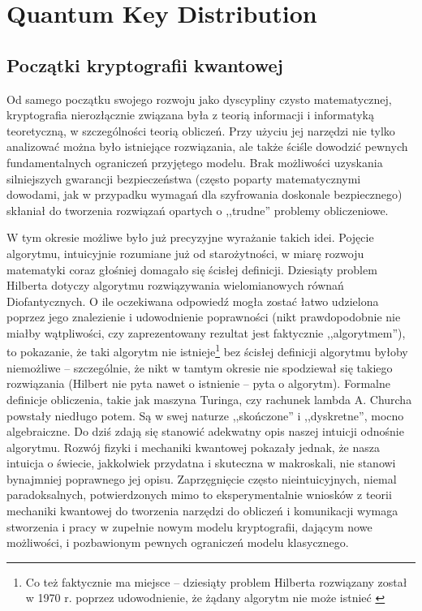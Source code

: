 \documentclass[10pt]{article}
\begin{document}

\section{Quantum Key Distribution}

\subsection{Początki kryptografii kwantowej}

Od samego początku swojego rozwoju jako dyscypliny czysto matematycznej, kryptografia nierozłącznie
związana była z teorią informacji i informatyką teoretyczną, w szczególności teorią obliczeń. Przy
użyciu jej narzędzi nie tylko analizować można było istniejące rozwiązania, ale także ściśle
dowodzić pewnych fundamentalnych ograniczeń przyjętego modelu. Brak możliwości uzyskania silniejszych
gwarancji bezpieczeństwa (często poparty matematycznymi dowodami, jak w przypadku wymagań dla 
szyfrowania doskonale bezpiecznego) skłaniał do tworzenia rozwiązań opartych o ,,trudne'' problemy
obliczeniowe. 

W tym okresie możliwe było już precyzyjne wyrażanie
takich idei. Pojęcie algorytmu, intuicyjnie rozumiane już od starożytności, w miarę rozwoju 
matematyki coraz głośniej domagało się ścisłej definicji. Dziesiąty problem Hilberta \cite{Gray01}
dotyczy algorytmu rozwiązywania wielomianowych równań Diofantycznych. O ile oczekiwana odpowiedź 
mogła zostać łatwo udzielona poprzez jego znalezienie i udowodnienie poprawności (nikt prawdopodobnie
nie miałby wątpliwości, czy zaprezentowany rezultat jest faktycznie ,,algorytmem''), to pokazanie,
że taki algorytm nie istnieje\footnote{Co też faktycznie ma miejsce -- dziesiąty problem Hilberta
rozwiązany został w 1970 r. poprzez udowodnienie, że żądany algorytm nie może istnieć 
\cite{Matiyasevich70}} bez ścisłej definicji algorytmu byłoby niemożliwe -- szczególnie,
że nikt w tamtym okresie nie spodziewał się takiego rozwiązania (Hilbert nie pyta nawet o istnienie
-- pyta o algorytm\footnotemark). Formalne definicje obliczenia, takie jak maszyna Turinga, czy rachunek
lambda A. Churcha powstały niedługo potem. Są w swej naturze ,,skończone'' i ,,dyskretne'', mocno
algebraiczne. Do dziś zdają się stanowić adekwatny opis naszej intuicji odnośnie algorytmu. Rozwój 
fizyki i mechaniki kwantowej pokazały jednak, że nasza intuicja o świecie, jakkolwiek przydatna 
i skuteczna w makroskali, nie stanowi bynajmniej poprawnego jej opisu. Zaprzęgnięcie często 
nieintuicyjnych, niemal paradoksalnych, potwierdzonych mimo to eksperymentalnie wniosków z teorii 
mechaniki kwantowej do tworzenia narzędzi do obliczeń i komunikacji wymaga stworzenia i pracy w 
zupełnie nowym modelu kryptografii, dającym nowe możliwości, i pozbawionym pewnych ograniczeń modelu
klasycznego.
 
\end{document}
